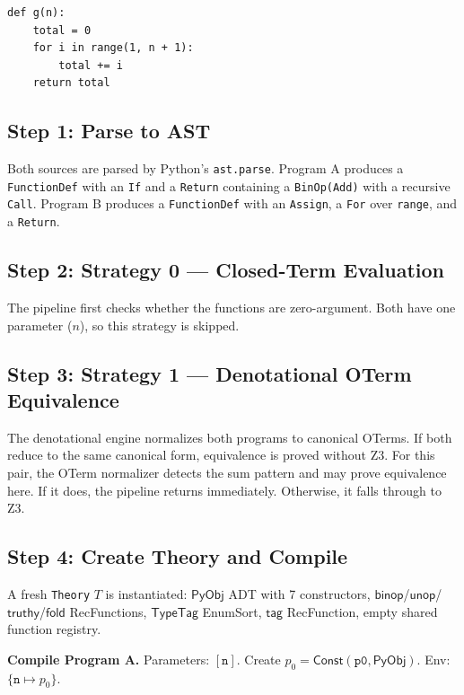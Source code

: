 \documentclass[11pt,a4paper]{report}
\theoremstyle{definition}
\theoremstyle{plain}
\newcommand{\PyObj}{\mathsf{PyObj}}
\newcommand{\fold}{\mathsf{fold}}
\begin{document}
\begin{lstlisting}[caption={Program B: iterative sum}]
def g(n):
    total = 0
    for i in range(1, n + 1):
        total += i
    return total
\end{lstlisting}

\subsection{Step 1: Parse to AST}

Both sources are parsed by Python's \texttt{ast.parse}.  Program A
produces a \texttt{FunctionDef} with an \texttt{If} and a
\texttt{Return} containing a \texttt{BinOp(Add)} with a recursive
\texttt{Call}.  Program B produces a \texttt{FunctionDef} with an
\texttt{Assign}, a \texttt{For} over \texttt{range}, and a
\texttt{Return}.

\subsection{Step 2: Strategy 0 --- Closed-Term Evaluation}

The pipeline first checks whether the functions are zero-argument.
Both have one parameter ($n$), so this strategy is skipped.

\subsection{Step 3: Strategy 1 --- Denotational OTerm Equivalence}

The denotational engine normalizes both programs to canonical OTerms.
If both reduce to the same canonical form, equivalence is proved
without Z3.  For this pair, the OTerm normalizer detects the sum
pattern and may prove equivalence here.  If it does, the pipeline
returns immediately.  Otherwise, it falls through to Z3.

\subsection{Step 4: Create Theory and Compile}

A fresh \texttt{Theory} $T$ is instantiated: $\PyObj$ ADT with 7
constructors, $\mathsf{binop}$/$\mathsf{unop}$/$\mathsf{truthy}$/$\fold$
RecFunctions, $\mathsf{TypeTag}$ EnumSort, $\mathsf{tag}$ RecFunction,
empty shared function registry.

\textbf{Compile Program A.}
Parameters: $[\texttt{n}]$.  Create $p_0 = \mathsf{Const}(\texttt{p0},
\PyObj)$.  Env: $\{\texttt{n} \mapsto p_0\}$.
\end{document}
